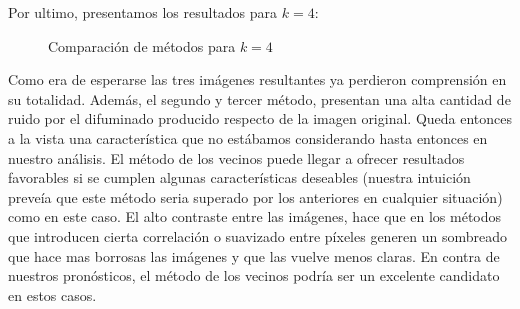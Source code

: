 Por ultimo, presentamos los resultados para $k=4$:

\begin{figure}[H]
    \centering
    \qquad
    \qquad
    \caption{Comparación de métodos para $k = 4$}
    \label{fig:example}
\end{figure}

Como era de esperarse las tres imágenes resultantes ya perdieron comprensión en su totalidad. Además, el segundo y tercer método, presentan una alta cantidad de ruido por el difuminado producido respecto de la imagen original.
Queda entonces a la vista una característica que no estábamos considerando hasta entonces en nuestro análisis. El método de los vecinos puede llegar a ofrecer resultados favorables si se cumplen algunas características deseables (nuestra intuición preveía que este método seria superado por los anteriores en cualquier situación) como en este caso. El alto contraste entre las imágenes, hace que en los métodos que introducen cierta correlación o suavizado entre píxeles generen un sombreado que hace mas borrosas las imágenes y que las vuelve menos claras. En contra de nuestros pronósticos, el método de los vecinos podría ser un excelente candidato en estos casos.


